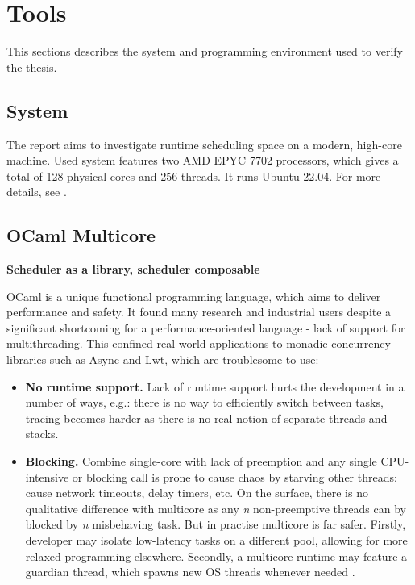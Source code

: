 \documentclass[12pt,a4paper,twoside]{report}
\begin{document}
\section{Tools}
This sections describes the system and programming environment used to verify the thesis. 

\subsection{System}
The report aims to investigate runtime scheduling space on a modern, high-core machine. Used system features two AMD EPYC 7702 processors, which gives a total of 128 physical cores and 256 threads. It runs Ubuntu 22.04. For more details, see . 

\subsection{OCaml Multicore}

\textbf{Scheduler as a library, scheduler composable}
\label{section:intr_ocaml-multicore}

OCaml is a unique functional programming language, which aims to deliver performance and safety. It found many research and industrial users despite a significant shortcoming for a performance-oriented language - lack of support for multithreading. This confined real-world applications to monadic concurrency libraries such as Async and Lwt, which are troublesome to use: 
\begin{itemize}
    \item \textbf{No runtime support.} Lack of runtime support hurts the development in a number of ways, e.g.: there is no way to efficiently switch between tasks, tracing becomes harder as there is no real notion of separate threads and stacks. 
    \item \textbf{Blocking.} Combine single-core with lack of preemption and any single CPU-intensive or blocking call is prone to cause chaos by starving other threads: cause network timeouts, delay timers, etc. On the surface, there is no qualitative difference with multicore as any \textit{n} non-preemptive threads can by blocked by \textit{n} misbehaving task. But in practise multicore is far safer. Firstly, developer may isolate low-latency tasks on a different pool, allowing for more relaxed programming elsewhere. Secondly, a multicore runtime may feature a guardian thread, which spawns new OS threads whenever needed \cite{golang}.
\end{itemize}
\end{document}
